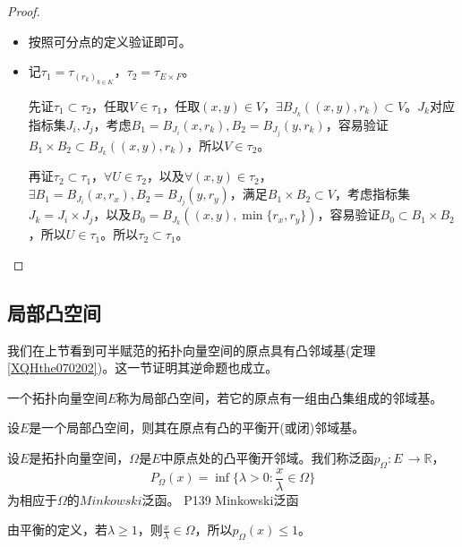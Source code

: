 \begin{proof}
	\begin{itemize}
		\item 按照可分点的定义验证即可。
		\item 记$\tau_{1}=\tau_{(r_{k})_{k\in K}} $，$\tau_{2}=\tau_{E\times F} $。\par
		先证$\tau_{1}\subset \tau_{2} $，任取$V\in \tau_{1} $，任取$(x,y)\in V $，$\exists B_{J_{k}}((x,y),r_{k})\subset V $。$J_{k} $对应指标集$J_{i},J_{j} $，考虑$B_{1}=B_{J_{i}}(x,r_{k}),B_{2}=B_{J_{j}}(y,r_{k})$，容易验证$B_{1}\times B_{2}\subset B_{J_{k}}((x,y),r_{k}) $，所以$V\in \tau_{2}$。\par
		再证$\tau_{2}\subset \tau_{1} $，$\forall U\in \tau_{2} $，以及$\forall (x,y)\in \tau_{2}$，$\exists B_{1}=B_{J_{i}}(x,r_{x}),B_{2}=B_{J_{j}}(y,r_{y}) $，满足$B_{1}\times B_{2}\subset V $，考虑指标集$J_{k}=J_{i}\times J_{j} $，以及$B_{0}=B_{J_{k}}((x,y),\min\{r_{x},r_{y}\}) $，容易验证$B_{0}\subset B_{1}\times B_{2} $，所以$U\in \tau_{1} $。所以$\tau_{2}\subset \tau_{1} $。
	\end{itemize}
\end{proof}	

\subsection{局部凸空间}
\hspace{2em}我们在上节看到可半赋范的拓扑向量空间的原点具有凸邻域基(定理\ref{XQHthe070202})。这一节证明其逆命题也成立。

\begin{proposition}
	一个拓扑向量空间$E$称为局部凸空间，若它的原点有一组由凸集组成的邻域基。
\end{proposition}

\begin{theorem}
	设$E$是一个局部凸空间，则其在原点有凸的平衡开(或闭)邻域基。
\end{theorem}

\original
{
	设$E$是拓扑向量空间，$\Omega$是$E$中原点处的凸平衡开邻域。我们称泛函$p_{\Omega}:E\, \rightarrow \mathbb{R} $，
	\begin{equation*}
		P_{\Omega}(x)=\inf\{\lambda >0:\frac{x}{\lambda}\in \Omega\}
	\end{equation*}
	为相应于$\Omega $的$Minkowski$泛函。
}
{P139 Minkowski泛函}
\begin{remark}
	由平衡的定义，若$\lambda \geq 1 $，则$\frac{x}{\lambda} \in \Omega $，所以$ p_{\Omega}(x)\leq 1$。
\end{remark}

